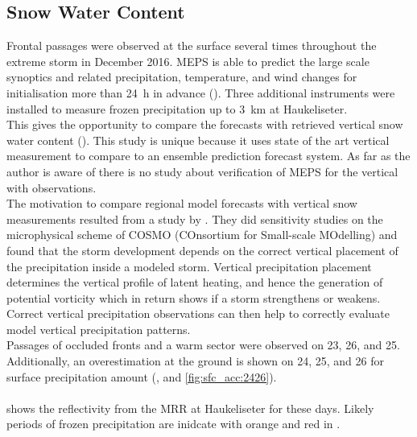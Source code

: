 \subsection{Snow Water Content}
\label{sec:res:large_scale_vert}
Frontal passages were observed at the surface several times throughout the extreme storm in December 2016. MEPS is able to predict the large scale synoptics and related precipitation, temperature, and wind changes for initialisation more than \SI{24}{\hour} in advance (). Three additional instruments were installed %
to measure frozen precipitation up to \SI{3}{\km} at Haukeliseter. 
\\
This %
gives the opportunity to compare the forecasts %
with retrieved vertical snow water content ().
This study is unique because it uses state of the art vertical measurement to compare to an ensemble prediction forecast system. As far as the author is aware of there is no study about verification of MEPS for the vertical %
with observations.
\\
The motivation to compare regional model forecasts with vertical snow measurements resulted from a study by \citet{joos_influence_2012}. They did sensitivity studies on the microphysical scheme of COSMO (COnsortium for Small-scale MOdelling) and found that the storm development depends on the correct vertical placement of the precipitation inside a modeled storm. Vertical precipitation placement determines the vertical profile of latent heating, and hence the generation of potential vorticity which in return shows if a storm strengthens or weakens. Correct vertical precipitation observations can then help to correctly evaluate model vertical precipitation patterns.
\\
Passages of occluded fronts and a warm sector were observed on \num{23}, \num{26}, and \SI{25}{\dec}. Additionally, an overestimation at the ground is shown on  \num{24}, \num{25}, and \SI{26}{\dec} for surface precipitation amount (,  and \ref{fig:sfc_acc:2426}). 
\\
\\
 shows the reflectivity from the MRR at Haukeliseter for these days. Likely periods of frozen precipitation are inidcate with orange and red in .%
